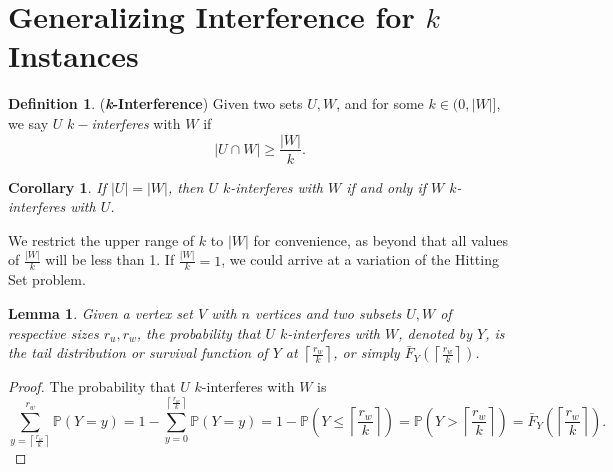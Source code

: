 \documentclass[10pt]{extarticle}
\newtheorem{lemma}[theorem]{Lemma}
\newtheorem{corollary}[theorem]{Corollary}
\theoremstyle{definition}
\newtheorem{definition}[theorem]{Definition}
\begin{document}
\section{Generalizing Interference for $k$ Instances}

\begin{definition}
    (\textbf{\textit{k}-Interference}) Given two sets $U, W$, and for some $k \in (0,|W|]$, we say $U$ $k-$\textit{interferes} with $W$ if 
    \begin{equation}
        |U \cap W| \ge  \frac{|W|}{k}.
    \end{equation}
\end{definition}

\begin{corollary}
\label{collorary:k-int-equals}
    If $|U| = |W|$, then $U$ $k$-interferes with $W$ if and only if $W$ $k$-interferes with $U$.
\end{corollary}

We restrict the upper range of $k$ to $|W|$ for convenience, as beyond that all values of $\frac{|W|}{k}$ will be less than 1. If $\frac{|W|}{k} = 1$, we could arrive at a variation of the Hitting Set problem. 


\begin{lemma}
\label{lemma:k-int-prob}
    Given a vertex set $V$ with $n$ vertices and two subsets $U,W$ of respective sizes $r_u,r_w$, the probability that $U$ $k$-interferes with $W$, denoted by $Y$, is the tail distribution or survival function of $Y$ at $\left\lceil \frac{r_w}{k} \right\rceil$, or simply $\bar{F}_Y\left(\left\lceil \frac{r_w}{k} \right\rceil\right)$.
\end{lemma}
\begin{proof}
    The probability that $U$ $k$-interferes with $W$ is 
    \begin{equation}
        \sum_{y = \left\lceil \frac{r_w}{k} \right\rceil}^{r_w} \mathbb{P}(Y=y) = 1 - \sum_{y = 0}^{\left\lceil \frac{r_w}{k} \right\rceil} \mathbb{P}(Y=y) = 1 - \mathbb{P}\left(Y\leq \left\lceil \frac{r_w}{k} \right\rceil\right) = \mathbb{P}\left(Y > \left\lceil \frac{r_w}{k} \right\rceil\right) = \bar{F}_Y\left(\left\lceil \frac{r_w}{k} \right\rceil\right).
    \end{equation}
\end{proof}
\end{document}
